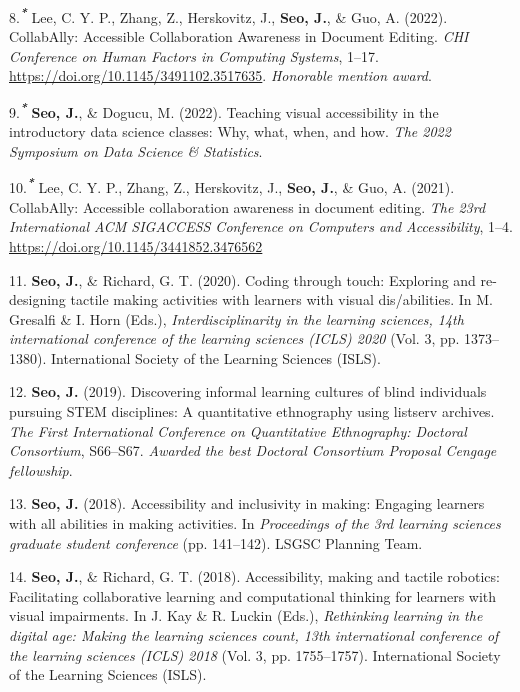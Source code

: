 \documentclass[11pt,a4paper,]{awesome-cv}
\begin{document}
\leavevmode{}%
8.\textsuperscript{\textbf{\emph{*}}} Lee, C. Y. P., Zhang, Z.,
Herskovitz, J., \textbf{Seo, J.}, \& Guo, A. (2022). CollabAlly:
Accessible Collaboration Awareness in Document Editing. \emph{CHI
Conference on Human Factors in Computing Systems}, 1--17.
\url{https://doi.org/10.1145/3491102.3517635}. \emph{Honorable mention
award}.

\leavevmode{}%
9.\textsuperscript{\textbf{\emph{*}}} \textbf{Seo, J.}, \& Dogucu, M.
(2022). Teaching visual accessibility in the introductory data science
classes: Why, what, when, and how. \emph{The 2022 Symposium on Data
Science \& Statistics}.

\leavevmode{}%
10.\textsuperscript{\textbf{\emph{*}}} Lee, C. Y. P., Zhang, Z.,
Herskovitz, J., \textbf{Seo, J.}, \& Guo, A. (2021). CollabAlly:
Accessible collaboration awareness in document editing. \emph{The 23rd
International ACM SIGACCESS Conference on Computers and Accessibility},
1--4. \url{https://doi.org/10.1145/3441852.3476562}

\leavevmode{}%
11. \textbf{Seo, J.}, \& Richard, G. T. (2020). Coding through touch:
Exploring and re-designing tactile making activities with learners with
visual dis/abilities. In M. Gresalfi \& I. Horn (Eds.),
\emph{Interdisciplinarity in the learning sciences, 14th international
conference of the learning sciences (ICLS) 2020} (Vol. 3, pp.
1373--1380). International Society of the Learning Sciences (ISLS).

\leavevmode{}%
12. \textbf{Seo, J.} (2019). Discovering informal learning cultures of
blind individuals pursuing STEM disciplines: A quantitative ethnography
using listserv archives. \emph{The First International Conference on
Quantitative Ethnography: Doctoral Consortium}, S66--S67. \emph{Awarded
the best Doctoral Consortium Proposal Cengage fellowship}.

\leavevmode{}%
13. \textbf{Seo, J.} (2018). Accessibility and inclusivity in making:
Engaging learners with all abilities in making activities. In
\emph{Proceedings of the 3rd learning sciences graduate student
conference} (pp. 141--142). LSGSC Planning Team.

\leavevmode{}%
14. \textbf{Seo, J.}, \& Richard, G. T. (2018). Accessibility, making
and tactile robotics: Facilitating collaborative learning and
computational thinking for learners with visual impairments. In J. Kay
\& R. Luckin (Eds.), \emph{Rethinking learning in the digital age:
Making the learning sciences count, 13th international conference of the
learning sciences (ICLS) 2018} (Vol. 3, pp. 1755--1757). International
Society of the Learning Sciences (ISLS).
\end{document}
